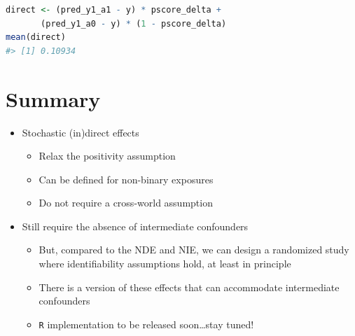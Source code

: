 \documentclass[
  12pt,
]{book}
\newcommand{\passthrough}[1]{#1}
\providecommand{\tightlist}{%
  \setlength{\itemsep}{0pt}\setlength{\parskip}{0pt}}
\theoremstyle{definition}
\theoremstyle{definition}
\theoremstyle{definition}
\newcommand{\1}{\mathbbm{1}}
\begin{document}
\begin{lstlisting}[language=R]
direct <- (pred_y1_a1 - y) * pscore_delta +
       (pred_y1_a0 - y) * (1 - pscore_delta)
mean(direct)
#> [1] 0.10934
\end{lstlisting}

\hypertarget{summary}{%
\section{Summary}\label{summary}}

\begin{itemize}
\tightlist
\item
  Stochastic (in)direct effects

  \begin{itemize}
  \tightlist
  \item
    Relax the positivity assumption
  \item
    Can be defined for non-binary exposures
  \item
    Do not require a cross-world assumption
  \end{itemize}
\item
  Still require the absence of intermediate confounders

  \begin{itemize}
  \tightlist
  \item
    But, compared to the NDE and NIE, we can design a randomized study where
    identifiability assumptions hold, at least in principle
  \item
    There is a version of these effects that can accommodate intermediate
    confounders \citep{hejazi2020nonparametric}
  \item
    \passthrough{\lstinline!R!} implementation to be released soon\ldots stay tuned!
  \end{itemize}
\end{itemize}

  

\backmatter
\printindex
\end{document}
